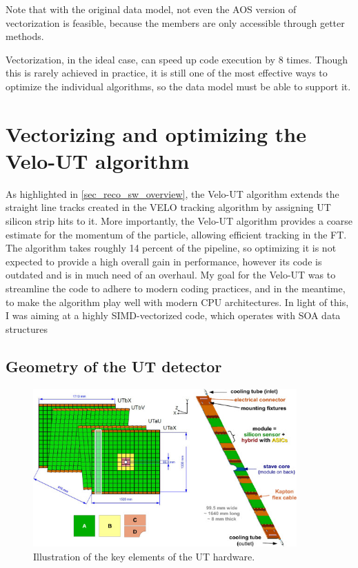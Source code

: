 \documentclass[12pt]{article}
\begin{document}
Note that with the original data model, not even the AOS version of vectorization is feasible, because the members are only accessible through getter methods.

Vectorization, in the ideal case, can speed up code execution by 8 times. Though this is rarely achieved in practice, it is still one of the most effective ways to optimize the individual algorithms, so the data model must be able to support it.


\newpage
\section{Vectorizing and optimizing the Velo-UT algorithm}\label{sec_opt_velout}

As highlighted in \ref{sec_reco_sw_overview}, the Velo-UT algorithm extends the straight line tracks created in the VELO tracking algorithm by assigning UT silicon strip hits to it. More importantly, the Velo-UT algorithm provides a coarse estimate for the momentum of the particle, allowing efficient tracking in the FT.
The algorithm takes roughly 14 percent of the pipeline, so optimizing it is not expected to provide a high overall gain in performance, however its code is outdated and is in much need of an overhaul. My goal for the Velo-UT was to streamline the code to adhere to modern coding practices, and in the meantime, to make the algorithm play well with modern CPU architectures. In light of this, I was aiming at a highly SIMD-vectorized code, which operates with SOA data structures


\subsection{Geometry of the UT detector}

\begin{figure}[H]
	\begin{center}
		\includegraphics[width=0.9\textwidth]{detector_ut_geometry}
	\end{center}
	\caption{Illustration of the key elements of the UT hardware.}
	\label{fig_ut_geometry}
\end{figure}
\end{document}
